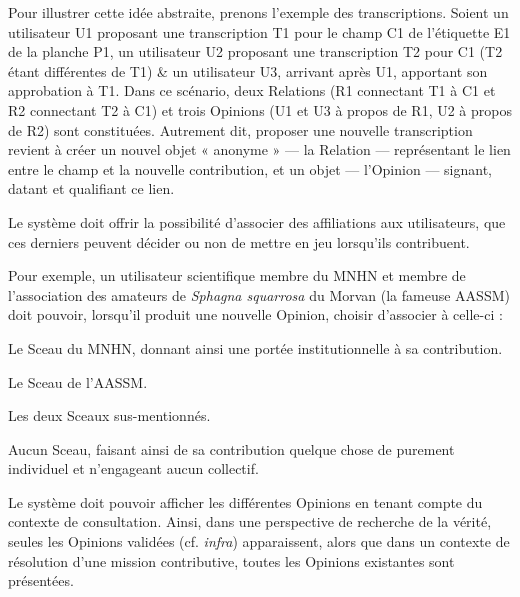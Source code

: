 Pour illustrer cette idée abstraite, prenons l'exemple des transcriptions.
Soient un utilisateur U1 proposant une transcription T1 pour le champ C1 de l'étiquette E1 de la planche P1, un utilisateur U2 proposant une transcription T2 pour C1 (T2 étant différentes de T1) & un utilisateur U3, arrivant après U1, apportant son approbation à T1.
Dans ce scénario, deux Relations (R1 connectant T1 à C1 et R2 connectant T2 à C1) et trois Opinions (U1 et U3 à propos de R1, U2 à propos de R2) sont constituées.
Autrement dit, proposer une nouvelle transcription revient à créer un nouvel objet « anonyme » --- la Relation --- représentant le lien entre le champ et la nouvelle contribution, et un objet --- l'Opinion --- signant, datant et qualifiant ce lien.

\startsubsection[title={Notion de Sceau}]

\fon{}
Le système doit offrir la possibilité d'associer des affiliations aux utilisateurs, que ces derniers peuvent décider ou non de mettre en jeu lorsqu'ils contribuent.

Pour exemple, un utilisateur scientifique membre du MNHN et membre de l'association des amateurs de {\it Sphagna squarrosa} du Morvan (la fameuse AASSM) doit pouvoir, lorsqu'il produit une nouvelle Opinion, choisir d'associer à celle-ci :

\startitemize
	\item Le Sceau du MNHN, donnant ainsi une portée institutionnelle à sa contribution.
	\item Le Sceau de l'AASSM.
	\item Les deux Sceaux sus-mentionnés.
	\item Aucun Sceau, faisant ainsi de sa contribution quelque chose de purement individuel et n'engageant aucun collectif.
\stopitemize

\startsubsection[title={Présentation des Opinions}]

\fon{}
Le système doit pouvoir afficher les différentes Opinions en tenant compte du contexte de consultation. Ainsi, dans une perspective de recherche de la vérité, seules les Opinions validées (cf. {\it infra}) apparaissent, alors que dans un contexte de résolution d'une mission contributive, toutes les Opinions existantes sont présentées.

\startsection[title={Fournir la donnée la plus pertinente}]

